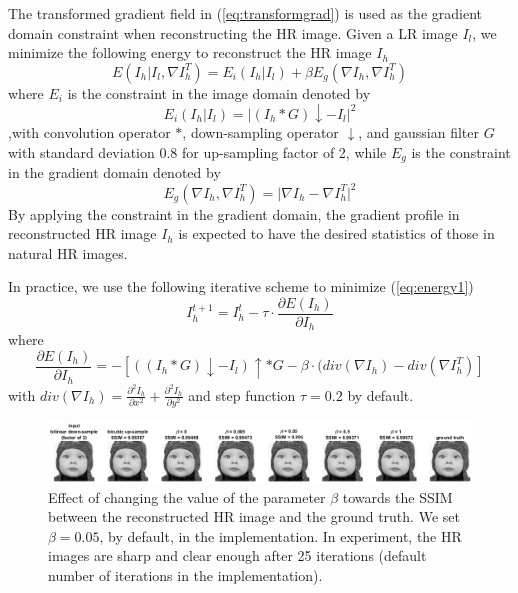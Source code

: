\documentclass[a4paper,11pt]{article}
\begin{document}
The transformed gradient field in (\ref{eq:transformgrad}) is used as the gradient domain constraint when reconstructing the HR image. Given a LR image $I_l$, we minimize the following energy to reconstruct the HR image $I_h$
\begin{equation}
	\label{eq:energy1}
	E(I_h | I_l, \nabla I_h^T) = E_i(I_h | I_l) + \beta E_g(\nabla I_h, \nabla I_h^T) 
\end{equation}
where $E_i$ is the constraint in the image domain denoted by
\begin{equation}
	\label{eq:energyi}
	E_i(I_h | I_l) = \lvert (I_h \ast G) \downarrow - I_l \rvert^2
\end{equation}
,with convolution operator $\ast$, down-sampling operator $\downarrow$, and gaussian filter $G$ with standard deviation 0.8 for up-sampling factor of 2, while $E_g$ is the constraint in the gradient domain denoted by
\begin{equation}
	\label{eq:energyg}
	E_g(\nabla I_h, \nabla I_h^T) = \lvert \nabla I_h - \nabla I_h^T \rvert^2
\end{equation}
By applying the constraint in the gradient domain, the gradient profile in reconstructed HR image $I_h$ is expected to have the desired statistics of those in natural HR images.

In practice, we use the following iterative scheme to minimize (\ref{eq:energy1})
\begin{equation}
	\label{eq:energy1}
	I_h^{t+1} = I_h^t - \tau \cdot \frac{\partial E(I_h)}{\partial I_h}
\end{equation}
where
\begin{equation}
	\frac{\partial E(I_h)}{\partial I_h} = - [((I_h \ast G) \downarrow - I_l) \uparrow \ast G - \beta \cdot (div(\nabla I_h) - div(\nabla I_h^T)]
\end{equation}
 with $div(\nabla I_h) = \frac{\partial^2 I_h}{\partial x^2} + \frac{\partial^2 I_h}{\partial y^2}$ and step function $\tau =0.2$ by default.

\begin{figure}[H]
	\centering
	\includegraphics[width=1\textwidth]{beta.png}
	\caption{Effect of changing the value of the parameter $\beta$ towards the SSIM between the reconstructed HR image and the ground truth. We set $\beta = 0.05$, by default, in the implementation. In experiment, the HR images are sharp and clear enough after 25 iterations (default number of iterations in the implementation).}
	\label{fig:beta}
\end{figure}
\end{document}
